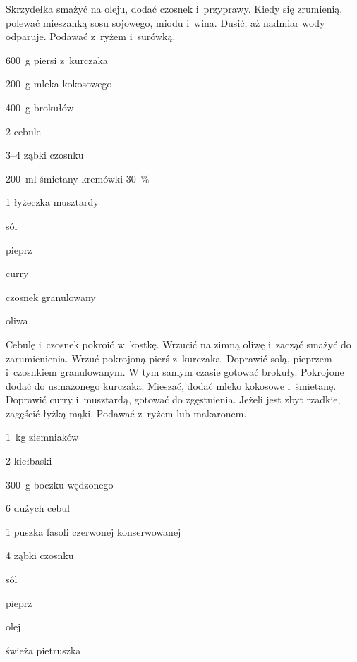 \documentclass[../main.tex]{subfiles}
\begin{document}
Skrzydełka smażyć na oleju, dodać czosnek i~przyprawy. Kiedy się zrumienią,
polewać mieszanką sosu sojowego, miodu i~wina. Dusić, aż nadmiar wody odparuje.
Podawać z~ryżem i~surówką.


\begin{Ingred}
    \item \qty{600}{\gram} piersi z~kurczaka
    \item \qty{200}{\gram} mleka kokosowego
    \item \qty{400}{\gram} brokułów
    \item \num{2} cebule
    \item \numrange{3}{4} ząbki czosnku
    \item \qty{200}{\milli\litre} śmietany kremówki \qty{30}{\percent}
    \item \num{1} łyżeczka musztardy
    \item sól
    \item pieprz
    \item curry
    \item czosnek granulowany
    \item oliwa
\end{Ingred}

Cebulę i~czosnek pokroić w~kostkę. Wrzucić na zimną oliwę i~zacząć smażyć do
zarumienienia. Wrzuć pokrojoną pierś z~kurczaka. Doprawić solą, pieprzem
i~czosnkiem granulowanym. W tym samym czasie gotować brokuły. Pokrojone dodać
do usmażonego kurczaka. Mieszać, dodać mleko kokosowe i~śmietanę. Doprawić
curry i~musztardą, gotować do zgęstnienia. Jeżeli jest zbyt rzadkie, zagęścić
łyżką mąki. Podawać z~ryżem lub makaronem.


\begin{Ingred}
    \item \qty{1}{\kilo\gram} ziemniaków
    \item \num{2} kiełbaski
    \item \qty{300}{\gram} boczku wędzonego
    \item \num{6} dużych cebul
    \item \num{1} puszka fasoli czerwonej konserwowanej
    \item \num{4} ząbki czosnku
    \item sól
    \item pieprz
    \item olej
    \item świeża pietruszka
\end{Ingred}
\end{document}
